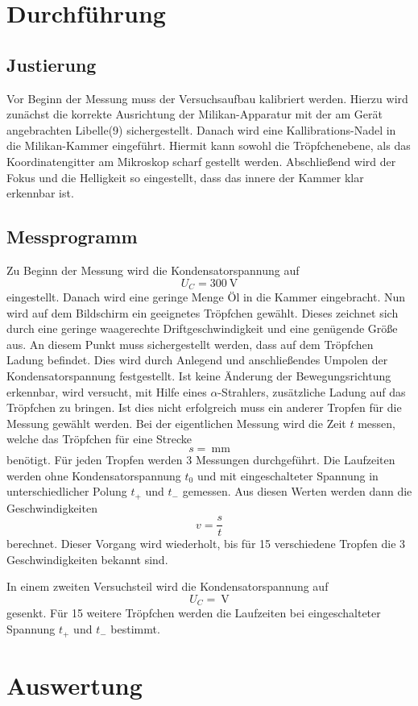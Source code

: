 \documentclass[11pt,ngerman,a4paper]{article}
\begin{document}
\section{Durchführung}
\subsection{Justierung}
Vor Beginn der Messung muss der Versuchsaufbau kalibriert werden. Hierzu wird zunächst die korrekte Ausrichtung der Milikan-Apparatur mit der am Gerät angebrachten Libelle(9) sichergestellt. Danach wird eine Kallibrations-Nadel in die Milikan-Kammer eingeführt. Hiermit kann sowohl die Tröpfchenebene, als das Koordinatengitter am Mikroskop scharf gestellt werden. Abschließend wird der Fokus und die Helligkeit so eingestellt, dass das innere der Kammer klar erkennbar ist.
\subsection{Messprogramm}
Zu Beginn der Messung wird die Kondensatorspannung auf 
\[
U_C = \SI{300}{\volt}
\]
eingestellt. Danach wird  eine geringe Menge Öl in die Kammer eingebracht. Nun wird auf dem Bildschirm ein geeignetes Tröpfchen gewählt. Dieses zeichnet sich durch eine geringe waagerechte Driftgeschwindigkeit und eine genügende Größe aus. An diesem Punkt muss sichergestellt werden, dass auf dem Tröpfchen Ladung befindet. Dies wird durch Anlegend und anschließendes Umpolen der Kondensatorspannung festgestellt. Ist keine Änderung der Bewegungsrichtung erkennbar, wird versucht, mit Hilfe eines $\alpha$-Strahlers, zusätzliche Ladung auf das Tröpfchen zu bringen. Ist dies nicht erfolgreich muss ein anderer Tropfen für die Messung gewählt werden.
Bei der eigentlichen Messung wird die Zeit $t$ messen, welche das Tröpfchen für eine Strecke
\[
s = \SI{}{\milli\meter}
\]
benötigt. Für jeden Tropfen werden 3 Messungen durchgeführt. Die Laufzeiten werden ohne Kondensatorspannung $t_0$ und mit eingeschalteter Spannung in unterschiedlicher Polung $t_+$ und $t_-$ gemessen. Aus diesen Werten werden dann die Geschwindigkeiten
\[
v = \frac{s}{t}
\]
berechnet. Dieser Vorgang wird wiederholt, bis für 15 verschiedene Tropfen die 3 Geschwindigkeiten bekannt sind.

In einem zweiten Versuchsteil wird die Kondensatorspannung auf 
\[
U_C = \SI{}{\volt}
\]
gesenkt. Für 15 weitere Tröpfchen werden die Laufzeiten bei eingeschalteter Spannung $t_+$ und $t_-$ bestimmt.
\section{Auswertung}
\end{document}
